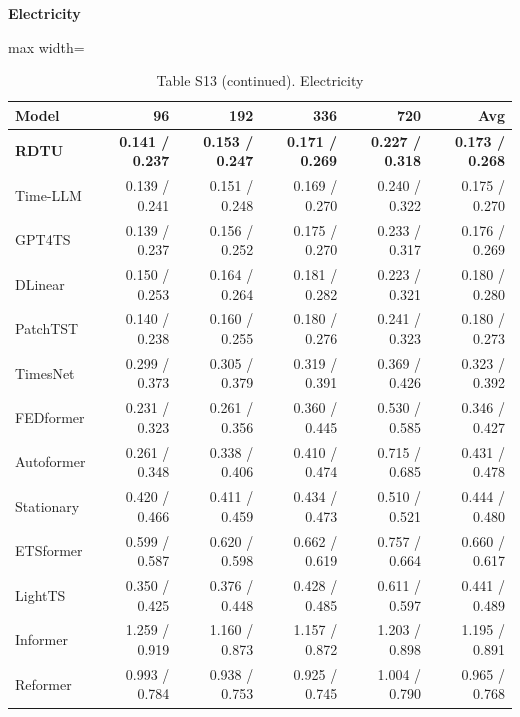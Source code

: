 \begin{table}[H]\centering\small
\caption*{Table S13 (continued). Electricity}
\textbf{Electricity}\par\smallskip
\begin{adjustbox}{max width=\linewidth}\begin{tabular}{lrrrrr}\toprule
\textbf{Model} & \textbf{96} & \textbf{192} & \textbf{336} & \textbf{720} & \textbf{Avg}\\\midrule
\rowcolor{blue!5}
\textbf{RDTU} & \textbf{0.141 / 0.237} & \textbf{0.153 / 0.247} & \textbf{0.171 / 0.269} & \textbf{0.227 / 0.318} & \textbf{0.173 / 0.268}\\
Time-LLM & 0.139 / 0.241 & 0.151 / 0.248 & 0.169 / 0.270 & 0.240 / 0.322 & 0.175 / 0.270\\
GPT4TS & 0.139 / 0.237 & 0.156 / 0.252 & 0.175 / 0.270 & 0.233 / 0.317 & 0.176 / 0.269\\
DLinear & 0.150 / 0.253 & 0.164 / 0.264 & 0.181 / 0.282 & 0.223 / 0.321 & 0.180 / 0.280\\
PatchTST & 0.140 / 0.238 & 0.160 / 0.255 & 0.180 / 0.276 & 0.241 / 0.323 & 0.180 / 0.273\\
TimesNet & 0.299 / 0.373 & 0.305 / 0.379 & 0.319 / 0.391 & 0.369 / 0.426 & 0.323 / 0.392\\
FEDformer & 0.231 / 0.323 & 0.261 / 0.356 & 0.360 / 0.445 & 0.530 / 0.585 & 0.346 / 0.427\\
Autoformer & 0.261 / 0.348 & 0.338 / 0.406 & 0.410 / 0.474 & 0.715 / 0.685 & 0.431 / 0.478\\
Stationary & 0.420 / 0.466 & 0.411 / 0.459 & 0.434 / 0.473 & 0.510 / 0.521 & 0.444 / 0.480\\
ETSformer & 0.599 / 0.587 & 0.620 / 0.598 & 0.662 / 0.619 & 0.757 / 0.664 & 0.660 / 0.617\\
LightTS & 0.350 / 0.425 & 0.376 / 0.448 & 0.428 / 0.485 & 0.611 / 0.597 & 0.441 / 0.489\\
Informer & 1.259 / 0.919 & 1.160 / 0.873 & 1.157 / 0.872 & 1.203 / 0.898 & 1.195 / 0.891\\
Reformer & 0.993 / 0.784 & 0.938 / 0.753 & 0.925 / 0.745 & 1.004 / 0.790 & 0.965 / 0.768\\
\bottomrule\end{tabular}\end{adjustbox}\end{table}
